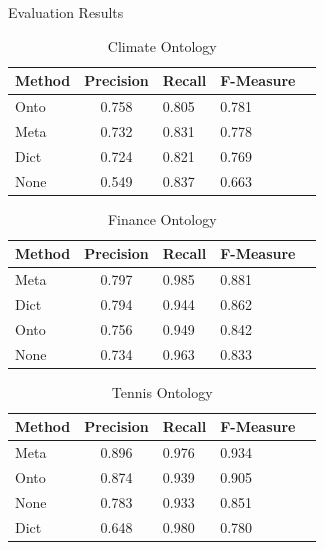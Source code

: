 \documentclass[final,hyperref={pdfpagelabels=true}]{beamer}
\begin{document}
\begin{frame}
\begin{columns}[t, onlytextwidth]
\begin{column}{\textwidth}
\begin{columns}[t, onlytextwidth]
\begin{column}{.49\textwidth}
\begin{block}{Evaluation Results}
\begin{minipage}[t][.23\textheight][c]{\textwidth}
\begin{minipage}[t]{0.93\textwidth}
\begin{minipage}[t]{\textwidth}
\begin{minipage}[t]{.48\textwidth}
									\begin{table}
										\scriptsize
										\captionsetup{font=scriptsize}
										\begin{tabularx}{\textwidth}{l | c*{3}{Y}}
											\toprule
											Method & Precision & Recall & F-Measure \\
											\midrule
											 Onto & 0.758 & 0.805 & 0.781 \\
											 Meta & 0.732 & 0.831 & 0.778 \\
											 Dict & 0.724 & 0.821 & 0.769 \\
											 None & 0.549 & 0.837 & 0.663 \\
											\bottomrule
										\end{tabularx}
										\caption{Climate Ontology}
									\end{table}
									
									\begin{table}
										\scriptsize
										\captionsetup{font=scriptsize}
										\begin{tabularx}{\textwidth}{l | c*{3}{Y}}
											\toprule
											Method & Precision & Recall & F-Measure \\
											\midrule
											 Meta & 0.797 & 0.985 & 0.881 \\
											 Dict & 0.794 & 0.944 & 0.862 \\
											 Onto & 0.756 & 0.949 & 0.842 \\
											 None & 0.734 & 0.963 & 0.833 \\
											\bottomrule
										\end{tabularx}
										\caption{Finance Ontology}
									\end{table}
									
									\begin{table}
										\scriptsize
										\captionsetup{font=scriptsize}
										\begin{tabularx}{\textwidth}{l | c*{3}{Y}}
											\toprule
											Method & Precision & Recall & F-Measure \\
											\midrule
											 Meta & 0.896 & 0.976 & 0.934 \\
											 Onto & 0.874 & 0.939 & 0.905 \\ 
											 None & 0.783 & 0.933 & 0.851 \\
											 Dict & 0.648 & 0.980 & 0.780 \\
											\bottomrule
										\end{tabularx}
										\caption{Tennis Ontology}
									\end{table}
									

\end{minipage}
\end{minipage}
\end{minipage}
\end{minipage}
\end{block}
\end{column}
\end{columns}
\end{column}
\end{columns}
\end{frame}
\end{document}
